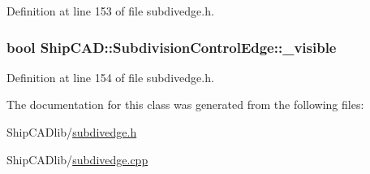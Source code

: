 Definition at line 153 of file subdivedge.\-h.

\hypertarget{classShipCAD_1_1SubdivisionControlEdge_a8d49343e2b6ff0ab13653849af242740}{
\subsubsection[{\-\_\-visible}]{\setlength{\rightskip}{0pt plus 5cm}bool Ship\-C\-A\-D\-::\-Subdivision\-Control\-Edge\-::\-\_\-visible\hspace{0.3cm}{\ttfamily [protected]}}}\label{classShipCAD_1_1SubdivisionControlEdge_a8d49343e2b6ff0ab13653849af242740}


Definition at line 154 of file subdivedge.\-h.



The documentation for this class was generated from the following files\-:\begin{DoxyCompactItemize}
\item 
Ship\-C\-A\-Dlib/\hyperlink{subdivedge_8h}{subdivedge.\-h}\item 
Ship\-C\-A\-Dlib/\hyperlink{subdivedge_8cpp}{subdivedge.\-cpp}\end{DoxyCompactItemize}
